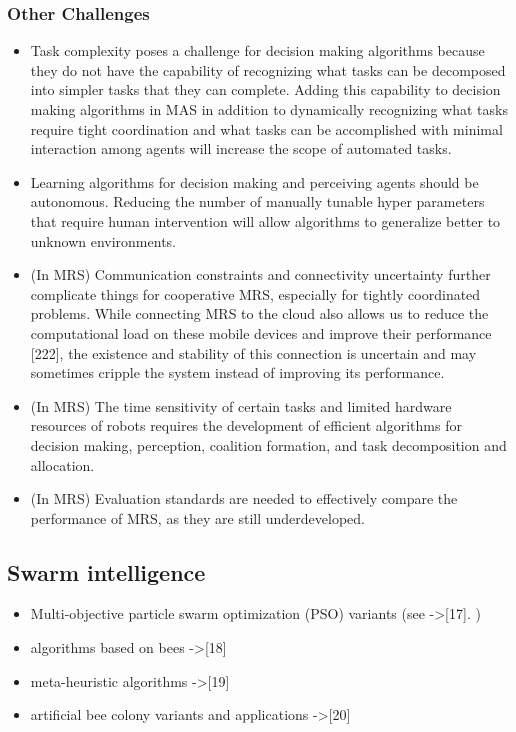 \documentclass{article}
\begin{document}
				\subsubsection{Other Challenges}
					\begin{itemize}
						\item Task complexity poses a challenge for decision making algorithms because they do not have the capability of recognizing what tasks can be decomposed into simpler tasks that they can complete. Adding this capability to decision making algorithms in MAS in addition to dynamically recognizing what tasks require tight coordination and what tasks can be accomplished with minimal interaction among agents will increase the scope of automated tasks.
						
						\item Learning algorithms for decision making and perceiving agents should be autonomous. Reducing the number of manually tunable hyper parameters that require human intervention will allow algorithms to generalize better to unknown environments.
						
						\item  (In MRS) Communication constraints and connectivity uncertainty further complicate things for cooperative MRS, especially for tightly coordinated problems. While connecting MRS to the cloud also allows us to reduce the computational load on these mobile devices and improve their performance \cite{rizk-2019-cooperative-heterogeneous-multi-robot-systems-a-survey}[222], the existence and stability of this connection is uncertain and may sometimes cripple the system instead of improving its performance. 
						
						\item (In MRS) The time sensitivity of certain tasks and limited hardware resources of robots requires the development of efficient algorithms for decision making, perception, coalition formation, and task decomposition and allocation. 
						
						\item (In MRS) Evaluation standards are needed to effectively compare the performance of MRS, as they are still underdeveloped.
					\end{itemize}
				
		\subsection{Swarm intelligence} 
			\begin{itemize}
				\item Multi-objective particle swarm optimization (PSO) variants (see \citet{rizk-2018-decision-making-in-multiagent-systems-a-survey}->[17].
				)
				\item algorithms based on bees \citet{rizk-2018-decision-making-in-multiagent-systems-a-survey}->[18]
				\item meta-heuristic algorithms \citet{rizk-2018-decision-making-in-multiagent-systems-a-survey}->[19]
				\item artificial bee colony variants and applications \citet{rizk-2018-decision-making-in-multiagent-systems-a-survey}->[20]
			\end{itemize}
			
\end{document}

